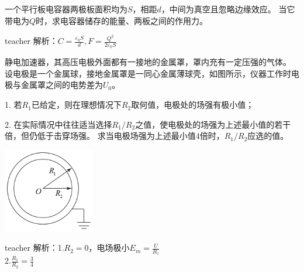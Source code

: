 \begin{example}
一个平行板电容器两极板面积均为$S$，相距$d$，中间为真空且忽略边缘效应。
当它带电为$Q$时，求电容器储存的能量、两板之间的作用力。
\begin{taggedblock}{teacher}
\newline
解析：$C=\frac{\varepsilon_0S}{d},F=\frac{Q^2}{2\varepsilon_0S}$
\end{taggedblock}
\end{example}



\begin{example}

静电加速器，其高压电极外面都有一接地的金属罩，罩内充有一定压强的气体。
设电极是一个金属球，接地金属罩是一同心金属薄球壳，如图所示，仪器工作时电极与金属罩之间的电势差为$U_0$。

1. 若$R_1$已给定，则在理想情况下$R_2$取何值，电极处的场强有极小值；

2. 在实际情况中往往适当选择$R_1/R_2$之值，使电极处的场强为上述最小值的若干倍，但仍低于击穿场强。
求当电极场强为上述最小值4倍时，$R_1/R_2$应选的值。
\begin{flushright}
\includegraphics[width = 0.3\textwidth]{images/elec-problem-16.pdf} 
\end{flushright}
\begin{taggedblock}{teacher}
\noindent
解析：1.$R_2=0$，电场极小$E_m=\frac{U}{R_1}$
\\2.$\frac{R_1}{R_2}=\frac{3}{4}$
\end{taggedblock}
\end{example}



